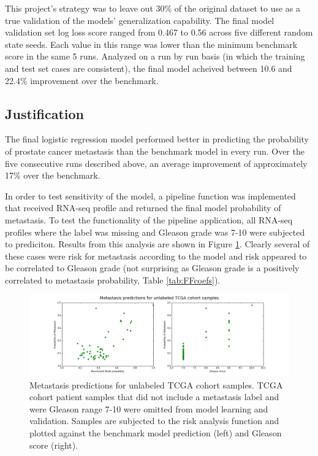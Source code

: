 \documentclass[final]{article}
\begin{document}
This project's strategy was to leave out 30\% of the original dataset to use as a
true validation of the models' generalization capability.  The final model validation
set log loss score ranged from 0.467 to 0.56 across five different random state
seeds.  Each value in this range was lower than the minimum benchmark score in the
same 5 runs.  Analyzed on a run by run basis (in which the training and test set cases
are consistent), the final model acheived between 10.6 and 22.4\% improvement over
the benchmark.

\subsection{Justification}

The final logistic regression model performed better in predicting the
probability of prostate cancer  metastasis than the benchmark model in every
run.  Over the five consecutive runs described above, an average improvement of
approximately 17\%  over the benchmark.

In order to test sensitivity of the model, a pipeline function was implemented
that received RNA-seq profile and returned the final model probability of
metastasis.  To test the functionality of the pipeline application, all RNA-seq
profiles where the label was missing and Gleason grade was 7-10 were subjected
to prediciton.  Results from this analysis are shown in Figure
\ref{fig:missing}.  Clearly several of these cases were risk for metastasis
according to the model and risk appeared to be correlated  to Gleason grade (not
surprising as Gleason grade is a positively correlated to metastasis
probability, Table \ref{tab:FFcoefs}).

\begin{figure}[h!]
  \centering
  \includegraphics[width=\textwidth]{missing}
  \caption{\label{fig:missing}Metastasis predictions for unlabeled TCGA cohort samples.  TCGA cohort patient samples that did not include a metastasis label and were Gleason range 7-10 were omitted from model learning and validation.  Samples are subjected to the risk analysis function and plotted against the benchmark model prediction (left) and Gleason score (right).}
\end{figure}
\end{document}

